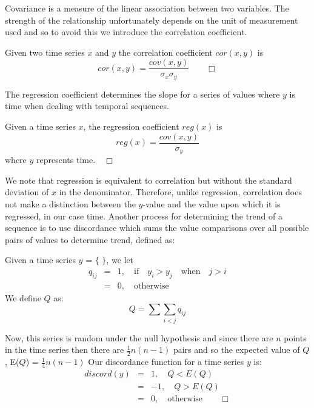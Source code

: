 Covariance is a measure of the linear association between two variables.
The strength of the relationship unfortunately depends on the unit of
measurement used and so to avoid this we introduce the correlation
coefficient.
\begin{definition}\label{def:correl}
\begin{rm}
Given two time series $x$ and $y$ the correlation coefficient
$cor(x,y)$ is
\[
cor(x,y) = \frac{cov(x,y)}{\sigma_x \sigma_y}\quad\quad\Box
\]
\end{rm}
\end{definition}

The regression coefficient determines the slope for a series of values
where $y$ is time when dealing with temporal sequences.
\begin{definition}\label{def:regcoef}
\begin{rm}
Given a time series $x$, the regression coefficient
$reg(x)$ is
\[
reg(x) = \frac{cov(x,y)}{\sigma_y}
\]
where $y$ represents time.$\quad\Box$
\end{rm}
\end{definition}

We note that regression is equivalent to correlation but without
the standard deviation of $x$ in the denominator. Therefore, unlike
regression, 
correlation does not make a distinction between the $y$-value and the
value upon which it is regressed, in our case time. Another process
for determining the trend of a sequence is to use discordance which
sums the value comparisons over all possible pairs of values to
determine trend, defined as: 
 
\begin{definition}\label{def:disccoef}
\begin{rm}
Given a time series $y$ = $\{$  $\}$, we let
\begin{eqnarray*}
q_{ij} & = & 1, \quad\mbox{if}\quad y_i > y_j \quad\mbox{when}\quad j > i \\
       & = & 0, \quad\mbox{otherwise}
\end{eqnarray*}
We define $Q$ as:
\[
Q = \sum \sum_{\!\!\!\!\!\!\!\!\!\!\!i < j} q_{ij}
\]

Now, this series is random under the null hypothesis and since there
are $n$ points in the time series then there are $\frac{1}{2} n(n-1)$
pairs and so the expected value of $Q$, E($Q$) = $\frac{1}{4} n(n-1)$
Our discordance function for a time series $y$ is:
\begin{eqnarray*}
discord(y) & = & 1,  \quad Q < E(Q) \\
      	   & = & -1, \quad Q > E(Q) \\
	   & = & 0,  \quad \mbox{otherwise} \quad\quad\Box
\end{eqnarray*}
\end{rm}
\end{definition}

